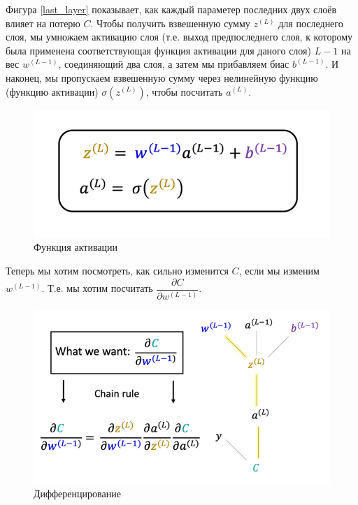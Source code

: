 \documentclass[a4paper, 10pt, openany]{book} %
\begin{document}
	Фигура \ref{last_layer} показывает, как каждый параметер последних двух слоёв влияет на потерю $C$. Чтобы получить взвешенную сумму $z^{(L)}$ для последнего слоя, мы умножаем активацию слоя (т.е. выход предпоследнего слоя, к которому была применена соответствующая функция активации для даного слоя) $L-1$ на вес $w^{(L-1)}$, соединяющий два слоя, а затем мы прибавляем биас $b^{(L-1)}$. И наконец, мы пропускаем взвешенную сумму через нелинейную функцию (функцию активации) $\sigma(z^{(L)})$, чтобы посчитать $a^{(L)}$.
	
	\begin{figure}[h!]
		\centering
		\includegraphics[width=\linewidth]{pictures/backpropagation/sigma.png}
		\caption{Функция активации}
		\label{weighted_sum}
	\end{figure}
	
	Теперь мы хотим посмотреть, как сильно изменится $C$, если мы изменим $w^{(L-1)}$. Т.е. мы хотим посчитать $\dfrac{\partial C}{\partial w^{(L-1)}}$.
	
	\begin{figure}[h!]
		\centering
		\includegraphics[width=\linewidth]{pictures/backpropagation/chain_rule.png}
		\caption{Дифференцирование}
		\label{derivative_1}
	\end{figure}
	
\end{document}
